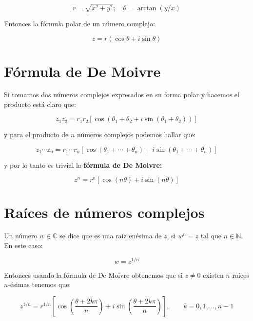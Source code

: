 \documentclass[12pt,a4paper]{book}
\newcommand{\parentesis}[1]{\left( #1  \right)}
\newcommand{\ccorchetes}[1]{\left[ #1  \right]}
\begin{document}
\begin{equation}
r = \sqrt{x^2 + y^2}; \quad \theta = \arctan (y/x)
\end{equation}

Entonces la fórmula polar de un número complejo:

\begin{equation}
z = r(\cos \theta + i \sin \theta)
\end{equation}

\section{Fórmula de De Moivre}

Si tomamos dos números complejos expresados en su forma polar y hacemos el producto está claro que:

\begin{equation}
z_1 z_2  = r_1 r_2 [\cos (\theta_1 + \theta_2 + i \sin (\theta_1 + \theta_2))]
\end{equation}

y para el producto de $n$ números complejos podemos hallar que:

\begin{equation}
z_1 \cdots z_n = r_1 \cdots r_n [\cos (\theta_1 + \cdots + \theta_n ) + i \sin(\theta_1 + \cdots + \theta_n )]
\end{equation}

y por lo tanto es trivial la \textbf{fórmula de De Moivre:}

\begin{equation}
z^n = r^n [\cos(n \theta)+i\sin(n \theta)]
\end{equation}

\section{Raíces de números complejos}

Un número $w \in \mathbb{C}$ se dice que es una raíz enésima de $z$, si $w^n=z$ tal que $n \in \mathbb{N}$. En este caso:

\begin{equation}
w = z^{1/n}
\end{equation}


Entonces usando la fórmula de De Moivre obtenemos que si $z \neq 0$ existen $n$ raíces $n$-ésimas tenemos que:

\begin{equation}
z^{1/n} = r^{1/n} \ccorchetes{\cos \parentesis{\frac{\theta+2k \pi}{n}} + i \sin \parentesis{\frac{\theta + 2k \pi}{n}}}, \quad \quad k=0,1,\ldots,n-1
\end{equation}
\end{document}
